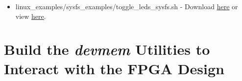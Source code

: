\begin{flushleft}
\begin{enumerate}[
	label=\textbf{Step \arabic*.},
	leftmargin=*,
	widest={00},
	align=left]
\begin{itemize}
\item linux\_examples/sysfs\_examples/toggle\_leds\_sysfs.sh - Download \href{\TheRawURL/MyFirstHPSSystem/writeup_linux/sysfs_examples/toggle_leds_sysfs.sh}{\underline{here}} or view \href{\TheBlobURL/MyFirstHPSSystem/writeup_linux/sysfs_examples/toggle_leds_sysfs.sh}{\underline{here}}.

\end{itemize}

\end{enumerate}

\end{flushleft}

\section*{Build the \emph{devmem} Utilities to Interact with the FPGA Design}

